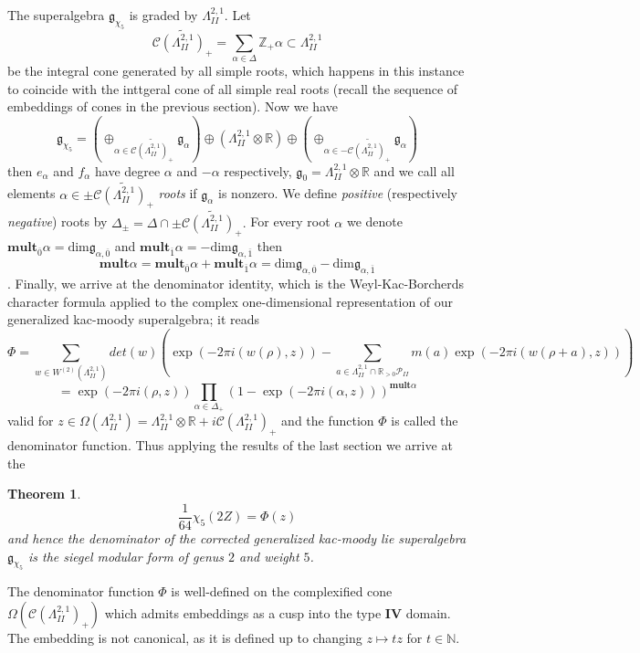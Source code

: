 \documentclass[9pt]{amsart} \usepackage[utf8]{inputenc}
\newtheorem{theorem}{Theorem}
\newcommand{\N}{\mathbb{N}}
\newcommand{\Z}{\mathbb{Z}} \newcommand{\C}{\mathbb{C}}
\newcommand{\R}{\mathbb{R}} \newcommand{\La}{\Lambda}
\newcommand{\IV}{\mathbf{IV}}
\newcommand{\Cone}{\mathcal{C}}
\newcommand{\Poly}{\mathcal{P}}
\newcommand{\autcor}{\mathfrak{g}_{\chi_5}}
\begin{document}
The superalgebra $\autcor$ is graded by
$\La^{2,1}_{II}$. Let $$\widetilde{\Cone(\La^{2,1}_{II})_+} =
\sum_{\alpha \in \Delta} \Z_+\alpha \subset \La^{2,1}_{II}$$ be the
integral cone generated by all simple roots, which happens in this
instance to coincide with the inttgeral cone of all simple real roots
(recall the sequence of embeddings of cones in the previous section).
Now we have $$\autcor = (\oplus_{\alpha \in
\widetilde{\Cone(\La^{2,1}_{II})_+}} \mathfrak{g}_{\alpha}) \oplus
(\La^{2,1}_{II} \otimes \R) \oplus (\oplus_{\alpha \in
-\widetilde{\Cone(\La^{2,1}_{II})_+}} \mathfrak{g}_{\alpha})$$
 then $e_{\alpha}$ and $f_{\alpha}$ have degree
$\alpha$ and $-\alpha$ respectively, $\mathfrak{g}_0 = \La^{2,1}_{II}
\otimes \R$ and we call all elements $\alpha \in
\pm\widetilde{\Cone(\La^{2,1}_{II})_+}$ \textit{roots} if
$\mathfrak{g}_{\alpha}$ is nonzero. We define \textit{positive}
(respectively \textit{negative}) roots by $\Delta_{\pm} = \Delta \cap
\pm\widetilde{\Cone(\La^{2,1}_{II})_+}.$ For every root $\alpha$ we
denote $\textbf{mult}_{\overline{0}}\alpha =
\textrm{dim}\mathfrak{g}_{\alpha,\overline{0}}$ and
$\textbf{mult}_{\overline{1}}\alpha =
-\textrm{dim}\mathfrak{g}_{\alpha,\overline{1}}$ then
$$\textbf{mult}\alpha = \textbf{mult}_{\overline{0}}\alpha +
\textbf{mult}_{\overline{1}}\alpha = \textrm{dim}
\mathfrak{g}_{\alpha,\overline{0}} -
\textrm{dim}\mathfrak{g}_{\alpha,\overline{1}}$$.
Finally, we arrive at the denominator identity, which is the
Weyl-Kac-Borcherds character formula applied to the complex
one-dimensional representation of our generalized kac-moody
superalgebra; it reads $$\Phi = \sum_{w \in W^{(2)}(\La^{2,1}_{II})} det(w)
(\exp(-2\pi i(w(\rho), z)) - \sum_{a\in \La^{2,1}_{II} \cap \R_{>0}
\Poly_{II}} m(a) \exp(-2\pi i(w(\rho + a), z)) ) $$ $$= \exp(-2\pi i(\rho,z))
\displaystyle\prod_{\alpha \in \Delta_+} (1 - \exp(-2\pi i
(\alpha,z)))^{\textbf{mult}\alpha}$$ valid for $z \in
\Omega(\La^{2,1}_{II}) = \La^{2,1}_{II} \otimes \R + i
\Cone(\La^{2,1}_{II})_+$ and the function $\Phi$ is called the
denominator function.  Thus applying the results of the last section we
arrive at the

\begin{theorem}
  $$\frac{1}{64}\chi_5(2Z) = \Phi(z)$$
  and hence the denominator of the \textit{corrected} generalized
  kac-moody lie superalgebra $\autcor$ is the
  siegel modular form of genus $2$ and weight $5$.
\end{theorem}

The denominator function $\Phi$ is well-defined on the complexified cone
$\Omega(\Cone(\La^{2,1}_{II})_+)$ which admits embeddings as a cusp into
the type $\IV$ domain. The embedding is not canonical, as it is defined
up to changing $z\mapsto tz$ for $t\in \N$.
\end{document}
